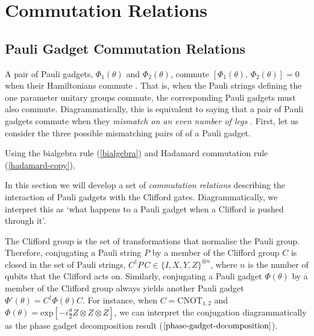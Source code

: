 \section{Commutation Relations}%
\label{commutation-relations}

\subsection{Pauli Gadget Commutation Relations}%
\label{pauli-gadget-commutation-relations}

A pair of Pauli gadgets, $\Phi_1(\theta)$ and $\Phi_2(\theta)$, commute $[\Phi_1(\theta), \, \Phi_2(\theta)] = 0$ when their Hamiltonians commute \cite{Yeung2020}. That is, when the Pauli strings defining the one parameter unitary groups commute, the corresponding Pauli gadgets must also commute. Diagrammatically, this is equivalent to saying that a pair of Pauli gadgets commute when they \textit{mismatch on an even number of legs} \cite{Yeung2020}. First, let us consider the three possible mismatching pairs of of a Pauli gadget.


Using the bialgebra rule (\ref{bialgebra}) and Hadamard commutation rule (\ref{hadamard-copy}), 



In this section we will develop a set of \textit{commutation relations} describing the interaction of Pauli gadgets with the Clifford gates. Diagrammatically, we interpret this as `what happens to a Pauli gadget when a Clifford is pushed through it'.

The Clifford group is the set of transformations that normalise the Pauli group. Therefore, conjugating a Pauli string $P$ by a member of the Clifford group $C$ is closed in the set of Pauli strings, $C^\dagger P \, C \in \{I, X, Y, Z\}^{\otimes n}$, where $n$ is the number of qubits that the Clifford acts on. Similarly, conjugating a Pauli gadget $\Phi(\theta)$ by a member of the Clifford group always yields another Pauli gadget $\Phi'(\theta) = C^\dagger \Phi(\theta) C$. For instance, when $C = \text{CNOT}_{1, 2}$ and $\Phi(\theta) = \text{exp} \left[ - i\frac{\theta}{2} Z \otimes Z \otimes Z \right]$, we can interpret the conjugation diagrammatically as the phase gadget decomposition result ($\ref{phase-gadget-decomposition}$).


